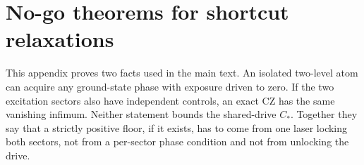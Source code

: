 \documentclass[aps,prx,reprint,nofootinbib,longbibliography,floatfix]{revtex4-2}
\theoremstyle{plain}
\theoremstyle{remark}
\begin{document}
\clearpage
\onecolumngrid
\appendix

\section{No-go theorems for shortcut relaxations}
\label{sec:nogo}

This appendix proves two facts used in the main text. An isolated two-level atom can acquire any ground-state phase with exposure driven to zero. If the two excitation sectors also have independent controls, an exact CZ has the same vanishing infimum. Neither statement bounds the shared-drive $C_*$. Together they say that a strictly positive floor, if it exists, has to come from one laser locking both sectors, not from a per-sector phase condition and not from unlocking the drive.
\end{document}
